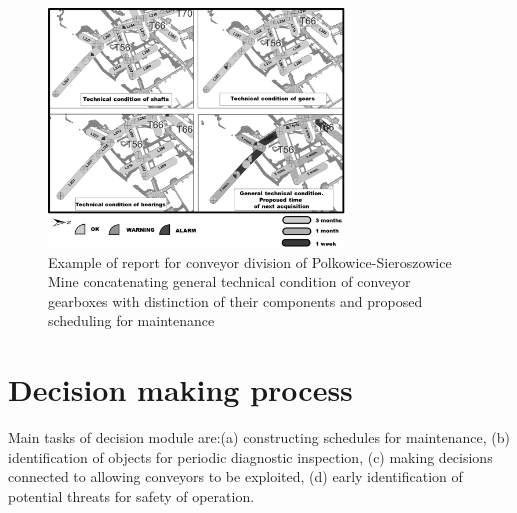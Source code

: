 \begin{figure}[ht!]
\centering
\includegraphics[width = 0.7\textwidth]{Wykresy/Fig_4}
\caption{Example of report for  conveyor division of Polkowice-Sieroszowice Mine concatenating general technical condition of conveyor gearboxes with distinction of their components and proposed scheduling for maintenance}
\label{fig: f4}
\end{figure} \par
\section{Decision making process}
Main tasks of decision module are:(a) constructing schedules for maintenance, (b) identification of objects for periodic diagnostic inspection, (c) making decisions connected to allowing conveyors to be exploited, (d) early identification of potential threats for safety of operation.

